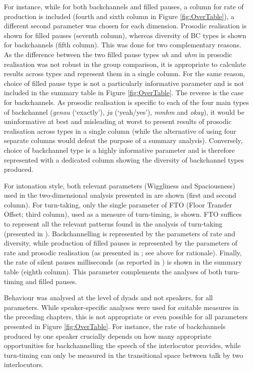 For instance, while for both backchannels and filled pauses, a column for rate of production is included (fourth and sixth column in Figure \ref{fig:OverTable}), a different second parameter was chosen for each dimension. Prosodic realisation is shown for filled pauses (seventh column), whereas diversity of BC types is shown for backchannels (fifth column). This was done for two complementary reasons. As the difference between the two filled pause types \emph{uh} and \emph{uhm} in prosodic realisation was not robust in the group comparison, it is appropriate to calculate results across types and represent them in a single column. For the same reason, choice of filled pause type is not a particularly informative parameter and is not included in the summary table in Figure \ref{fig:OverTable}. The reverse is the case for backchannels. As prosodic realisation is specific to each of the four main types of backchannel (\emph{genau} (`exactly'), \emph{ja} (`yeah/yes'), \emph{mmhm} and \emph{okay}), it would be uninformative at best and misleading at worst to present results of prosodic realisation across types in a single column (while the alternative of using four separate columns would defeat the purpose of a summary analysis). Conversely, choice of backchannel type is a highly informative parameter and is therefore represented with a dedicated column showing the diversity of backchannel types produced.

For intonation style, both relevant parameters (Wiggliness and Spaciousness) used in the two-dimensional analysis presented in  are shown (first and second column). For turn-taking, only the single parameter of FTO (Floor Transfer Offset; third column), used as a measure of turn-timing, is shown. FTO suffices to represent all the relevant patterns found in the analysis of turn-taking (presented in ). Backchannelling is represented by the parameters of rate and diversity, while production of filled pauses is represented by the parameters of rate and prosodic realisation (as presented in ; see above for rationale). Finally, the rate of silent pauses  milliseconds (as reported in ) is shown in the summary table (eighth column). This parameter complements the analyses of both turn-timing and filled pauses.

Behaviour was analysed at the level of dyads and not speakers, for all parameters. While speaker-specific analyses were used for suitable measures in the preceding chapters, this is not appropriate or even possible for all parameters presented in Figure \ref{fig:OverTable}. For instance, the rate of backchannels produced by one speaker crucially depends on how many appropriate opportunities for backchannelling the speech of the interlocutor provides, while turn-timing can only be measured in the transitional space between talk by two interlocutors.

